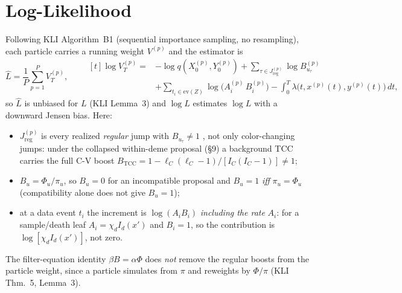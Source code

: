 \documentclass[11pt]{article}
\newcommand{\evZ}{\mathrm{ev}(Z)}
\theoremstyle{plain}
\begin{document}
\section{Log-Likelihood}
Following KLI Algorithm~B1 (sequential importance sampling, no resampling), each particle carries a
running weight $V^{(p)}$ and the estimator is
\[
\hat L=\frac1P\sum_{p=1}^{P}V_T^{(p)},\qquad
\begin{aligned}[t]
\log V_T^{(p)}={}&-\log q\!\left(X_0^{(p)},Y_0^{(p)}\right)+\sum_{\tau\in J^{(p)}_{\mathrm{reg}}}\log B^{(p)}_{u_\tau}\\
&+\sum_{t_i\in\evZ}\log\!\big(A^{(p)}_i\,B^{(p)}_i\big)
-\int_0^T\lambda\big(t,x^{(p)}(t),y^{(p)}(t)\big)\,dt,
\end{aligned}
\]
so $\hat L$ is unbiased for $L$ (KLI Lemma~3) and $\log\hat L$ estimates $\log L$ with a downward
Jensen bias. Here:
\begin{itemize}[leftmargin=1.4em,nosep]
\item $J^{(p)}_{\mathrm{reg}}$ is every realized \emph{regular} jump with $B_{u_\tau}\neq1$ , not only color-changing jumps: under the collapsed within-deme proposal (\S9) a background TCC carries the full
C-V boost $B_{\mathrm{TCC}}=1-\ell_C(\ell_C-1)/[I_C(I_C-1)]\neq1$;
\item $B_u=\Phi_u/\pi_u$, so $B_u=0$ for an incompatible proposal and $B_u=1$ \emph{iff} $\pi_u=\Phi_u$
(compatibility alone does not give $B_u=1$);
\item at a data event $t_i$ the increment is $\log(A_i B_i)$ \emph{including the rate} $A_i$: for a
sample/death leaf $A_i=\chi_d I_d(x')$ and $B_i=1$, so the contribution is $\log[\chi_d I_d(x')]$, not
zero.
\end{itemize}
The filter-equation identity $\beta B=\alpha\Phi$ does \emph{not} remove the regular boosts from the particle
weight, since a particle simulates from $\pi$ and reweights by $\Phi/\pi$ (KLI Thm.~5, Lemma~3).
\end{document}

